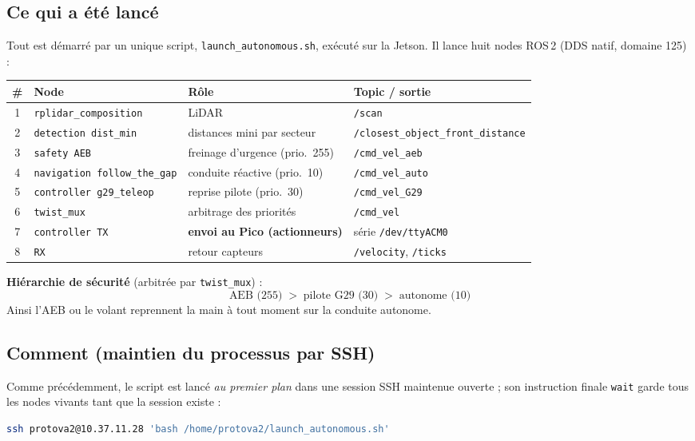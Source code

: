 \documentclass[a4paper,11pt]{article}
\begin{document}
\subsection{Ce qui a été lancé}
Tout est démarré par un unique script, \texttt{launch\_autonomous.sh}, exécuté
sur la Jetson. Il lance huit nodes ROS\,2 (DDS natif, domaine 125) :
\begin{table}[H]
\centering
\begin{tabularx}{\textwidth}{@{}c l X l@{}}
\toprule
\# & Node & Rôle & Topic / sortie \\
\midrule
1 & \texttt{rplidar\_composition}        & LiDAR                              & \texttt{/scan} \\
2 & \texttt{detection dist\_min}          & distances mini par secteur        & \texttt{/closest\_object\_front\_distance} \\
3 & \texttt{safety AEB}                   & freinage d'urgence (prio.\ 255)   & \texttt{/cmd\_vel\_aeb} \\
4 & \texttt{navigation follow\_the\_gap}  & conduite réactive (prio.\ 10)     & \texttt{/cmd\_vel\_auto} \\
5 & \texttt{controller g29\_teleop}       & reprise pilote (prio.\ 30)        & \texttt{/cmd\_vel\_G29} \\
6 & \texttt{twist\_mux}                   & arbitrage des priorités           & \texttt{/cmd\_vel} \\
7 & \texttt{controller TX}                & \textbf{envoi au Pico (actionneurs)} & série \texttt{/dev/ttyACM0} \\
8 & \texttt{RX}                           & retour capteurs                   & \texttt{/velocity}, \texttt{/ticks} \\
\bottomrule
\end{tabularx}
\end{table}

\noindent \textbf{Hiérarchie de sécurité} (arbitrée par \texttt{twist\_mux}) :
\[
\text{AEB (255)} \;>\; \text{pilote G29 (30)} \;>\; \text{autonome (10)}
\]
Ainsi l'AEB ou le volant reprennent la main à tout moment sur la conduite
autonome.

\subsection{Comment (maintien du processus par SSH)}
Comme précédemment, le script est lancé \emph{au premier plan} dans une session
SSH maintenue ouverte ; son instruction finale \texttt{wait} garde tous les nodes
vivants tant que la session existe :
\begin{lstlisting}[language=bash]
ssh protova2@10.37.11.28 'bash /home/protova2/launch_autonomous.sh'
\end{lstlisting}
\end{document}
